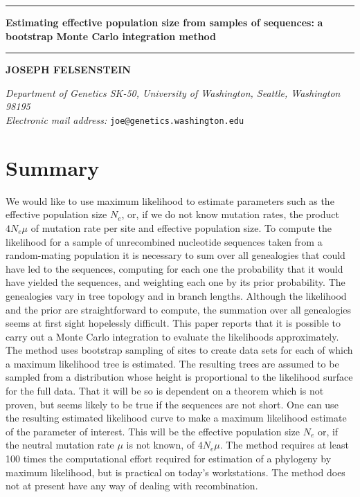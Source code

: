 \def\baselinestretch{1.5}

\hrule
\bigskip
\begin{flushleft}
{\bf Estimating effective population size from samples of sequences:}
{\bf a bootstrap Monte Carlo integration method}
\bigskip
\hrule
\bigskip

{\bf JOSEPH FELSENSTEIN}

\bigskip
{\it Department of Genetics SK-50, University of Washington, Seattle, Washington 98195}\\
{\it Electronic mail address:} {\tt joe{\rm @}genetics.washington.edu}
\end{flushleft}

\section*{Summary}
We would like to use maximum likelihood to estimate parameters such as the
effective population size $N_e$, or, if we do not know mutation rates, the
product $4N_e\mu$ of mutation rate per site and effective population size.
To compute the likelihood for a sample of unrecombined nucleotide sequences
taken from a random-mating population it is necessary to sum over all
genealogies that could have led to the sequences, computing for each one
the probability that it would have yielded the sequences, and weighting each
one by its prior probability.  The genealogies vary
in tree topology and in branch lengths.  Although the likelihood and the prior
are straightforward to compute, the summation over all genealogies
seems at first sight hopelessly difficult.  This paper reports that it is
possible to carry out a Monte Carlo integration to evaluate the likelihoods
approximately.  The method uses bootstrap sampling of
sites to create data sets for each of which a maximum likelihood tree is
estimated.  The resulting trees are assumed to be sampled from a distribution
whose height is proportional to the likelihood surface for the full data.
That it will be so is dependent on a theorem which is not
proven, but seems likely to be true if the sequences are not short.  One can
use the resulting estimated
likelihood curve to make a maximum likelihood estimate of the parameter of
interest.  This will be the effective
population size $N_e$ or, if the neutral mutation rate $\mu$ is not known, of
$4N_e\mu$.  The method requires at least 100 times the computational effort
required for estimation of a phylogeny by maximum likelihood, but is practical
on today's workstations.  The method does not at present have any way of
dealing with recombination.

